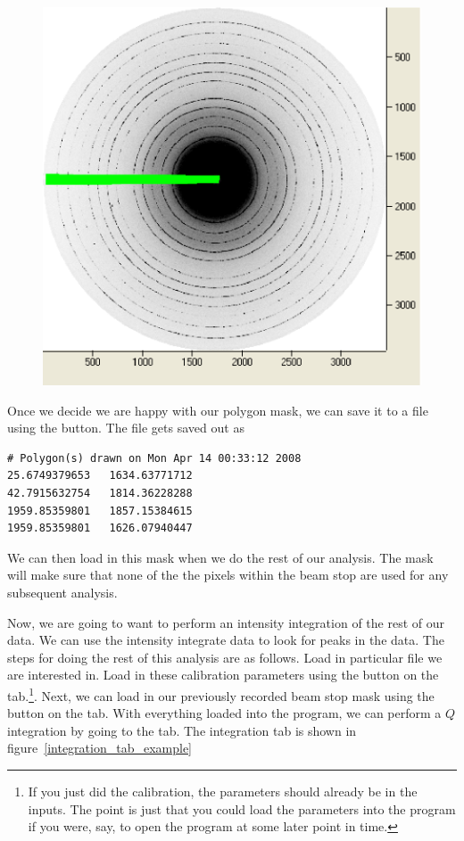 \begin{figure}
    \centering
    \includegraphics[scale=.75]{figures/masked_beam_stop.eps}
    \caption{}
    \label{masked_beam_stop}
\end{figure}

Once we decide we are happy with our polygon mask, we can
save it to a file using the  button.
The file gets saved out as
\begin{lstlisting}[caption={'beam\_stop\_mask.dat'}]
# Polygon(s) drawn on Mon Apr 14 00:33:12 2008
25.6749379653	1634.63771712
42.7915632754	1814.36228288
1959.85359801	1857.15384615
1959.85359801	1626.07940447
\end{lstlisting}
We can then load in this mask when we do the rest of
our analysis. The mask will make sure that none of the
the pixels within the beam stop are used for any subsequent
analysis.

Now, we are going to want to perform an intensity integration 
of the rest of our data. We can use the intensity
integrate data to look for peaks in the data.
The steps for doing the rest of
this analysis are as follows. Load in particular file we
are interested in. Load in these calibration parameters
using the  button on the 
tab.\footnote{If you just did the calibration, the 
parameters should already be in the inputs. The point is
just that you could load the parameters into the program
if you were, say, to open the program at some later point
in time.}. Next, we can load in our previously recorded
beam stop mask using the  button on the
 tab. With everything loaded into the program, 
we can perform a $Q$ integration by going to the 
 tab. The integration tab is shown in 
figure~\ref{integration_tab_example}

